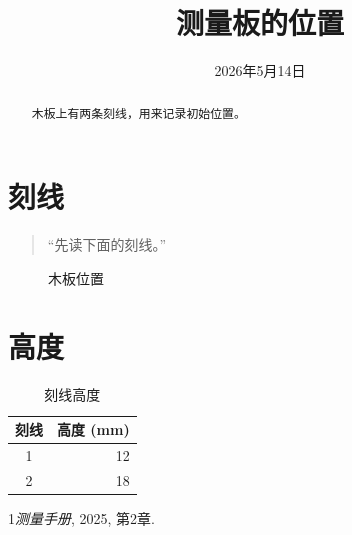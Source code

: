 \documentclass[scheme=chinese,fontset=mac]{ctexart}
\begin{document}
\title{测量板的位置}\author{}\date{2026年5月14日}\maketitle
\begin{abstract}木板上有两条刻线，用来记录初始位置。\end{abstract}
\tableofcontents
\section{刻线}\begin{quote}“先读下面的刻线。”\end{quote}
\begin{figure}[ht]\centering\fbox{\rule{0pt}{8mm}\rule{33mm}{0pt}}\caption{木板位置}\end{figure}
\section{高度}
\begin{table}[ht]\centering\begin{tabular}{cr}刻线&高度 (mm)\\\hline 1&12\\2&18\end{tabular}\caption{刻线高度}\end{table}
\begin{thebibliography}{1}\emph{测量手册}, 2025, 第2章.\end{thebibliography}
\end{document}
